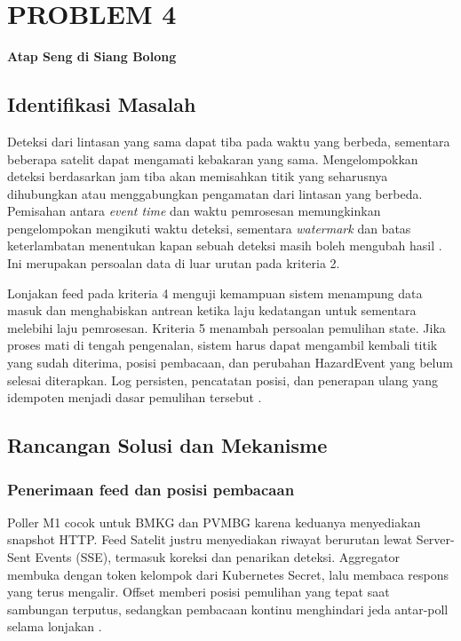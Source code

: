 \chapter{PROBLEM 4}
\label{ch:p4}

\begin{center}\large\bfseries Atap Seng di Siang Bolong\end{center}

\section{Identifikasi Masalah}

Deteksi dari lintasan yang sama dapat tiba pada waktu yang berbeda, sementara beberapa satelit dapat mengamati kebakaran yang sama. Mengelompokkan deteksi berdasarkan jam tiba akan memisahkan titik yang seharusnya dihubungkan atau menggabungkan pengamatan dari lintasan yang berbeda. Pemisahan antara \emph{event time} dan waktu pemrosesan memungkinkan pengelompokan mengikuti waktu deteksi, sementara \emph{watermark} dan batas keterlambatan menentukan kapan sebuah deteksi masih boleh mengubah hasil \cite{akidau2015}. Ini merupakan persoalan data di luar urutan pada kriteria 2.

Lonjakan feed pada kriteria 4 menguji kemampuan sistem menampung data masuk dan menghabiskan antrean ketika laju kedatangan untuk sementara melebihi laju pemrosesan. Kriteria 5 menambah persoalan pemulihan state. Jika proses mati di tengah pengenalan, sistem harus dapat mengambil kembali titik yang sudah diterima, posisi pembacaan, dan perubahan HazardEvent yang belum selesai diterapkan. Log persisten, pencatatan posisi, dan penerapan ulang yang idempoten menjadi dasar pemulihan tersebut \cite{kleppmann2017}.

\section{Rancangan Solusi dan Mekanisme}

\subsection{Penerimaan feed dan posisi pembacaan}

Poller M1 cocok untuk BMKG dan PVMBG karena keduanya menyediakan snapshot HTTP. Feed Satelit justru menyediakan riwayat berurutan lewat Server-Sent Events (SSE), termasuk koreksi dan penarikan deteksi. Aggregator membuka  dengan token kelompok dari Kubernetes Secret, lalu membaca respons yang terus mengalir. Offset memberi posisi pemulihan yang tepat saat sambungan terputus, sedangkan pembacaan kontinu menghindari jeda antar-poll selama lonjakan \cite{sse}.

